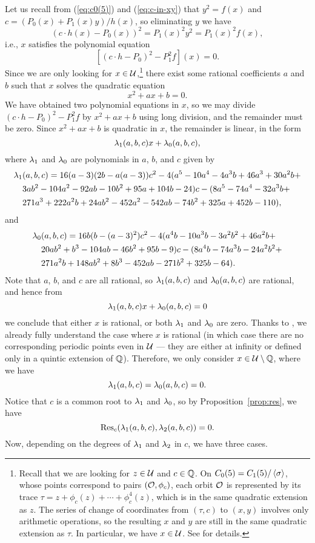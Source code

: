 Let us recall from (\ref{eq:c0(5)}) and (\ref{eq:c-in-xy}) that $y^2 =
f(x)$ and $c = (P_0(x) + P_1(x) y)/h(x)$, so eliminating $y$ we have
\[
(c \cdot h(x) - P_0(x))^2 = P_1(x)^2 y^2 = P_1(x)^2 f(x),
\]
i.e., $x$ satisfies the polynomial equation
\[
[(c \cdot h - P_0)^2 - P_1^2 f](x) = 0.
\]
Since we are only looking for $x \in \mathcal{U}$,\footnote{%
  Recall that we are looking for $z \in \mathcal{U}$ and $c \in \mathbb{Q}$. On $C_0(5)
  = C_1(5) / \left<\sigma\right>$, whose points correspond to pairs $(\mathcal{O},
  \phi_c)$, each orbit $\mathcal{O}$ is represented by its trace $\tau = z +
  \phi_c(z) + \cdots + \phi_c^4(z)$, which is in the same quadratic
  extension as $z$. The series of change of coordinates from $(\tau,
  c)$ to $(x, y)$ involves only arithmetic operations, so the
  resulting $x$ and $y$ are still in the same quadratic extension as
  $\tau$. In particular, we have $x \in \mathcal{U}$. See \cite{MR1480542} for
  details.}
there exist some rational coefficients $a$ and $b$ such that $x$
solves the quadratic equation
\[
x^2 + a x + b = 0.
\]
We have obtained two polynomial equations in $x$, so we may divide $(c
\cdot h - P_0)^2 - P_1^2 f$ by $x^2 + ax + b$ using long division, and
the remainder must be zero. Since $x^2 + ax + b$ is quadratic in $x$,
the remainder is linear, in the form
\[
\lambda_1(a, b, c) x + \lambda_0(a, b, c),
\]
where $\lambda_1$ and $\lambda_0$ are polynomials in $a$, $b$, and $c$ given by
\[
\begin{aligned}
  \lambda_1&(a, b, c) = 16 (a - 3) (2b - a(a-3)) c^2 -
  4(a^{5} - 10 a^{4} - 4 a^{3} b + 46 a^{3} + 30 a^{2} b + \\
  & 3 a b^{2} - 104 a^{2} - 92 a b - 10 b^{2} + 95 a + 104 b - 24) c -
  (8 a^{5} - 74 a^{4} - 32 a^{3} b + \\
  & 271 a^{3} + 222 a^{2} b + 24 a b^{2} - 452 a^{2} - 542 a b - 74
  b^{2} + 325 a + 452 b - 110),
\end{aligned}
\]
and
\[
\begin{aligned}
  \lambda_0&(a, b, c) = 16 b (b - (a-3)^2) c^2 -
  4(a^{4} b - 10 a^{3} b - 3 a^{2} b^{2} + 46 a^{2} b + \\
  & 20 a b^{2} + b^{3} - 104 a b - 46 b^{2} + 95 b - 9) c -
  (8 a^{4} b - 74 a^{3} b - 24 a^{2} b^{2} + \\
  & 271 a^{2} b + 148 a b^{2} + 8 b^{3} - 452 a b - 271 b^{2} + 325 b
  - 64).
\end{aligned}
\]
Note that $a$, $b$, and $c$ are all rational, so $\lambda_1(a, b, c)$ and
$\lambda_0(a, b, c)$ are rational, and hence from
\[
\lambda_1(a, b, c) x + \lambda_0(a, b, c) = 0
\]
we conclude that either $x$ is rational, or both $\lambda_1$ and $\lambda_0$ are
zero. Thanks to \cite{MR1480542}, we already fully understand the case
where $x$ is rational (in which case there are no corresponding
periodic points even in $\mathcal{U}$ --- they are either at infinity or
defined only in a quintic extension of $\mathbb{Q}$). Therefore, we only
consider $x \in \mathcal{U} \setminus \mathbb{Q}$, where we have
\[
\lambda_1(a, b, c) = \lambda_0(a, b, c) = 0.
\]
Notice that $c$ is a common root to $\lambda_1$ and $\lambda_0$, so by
Proposition~\ref{prop:res}, we have
\[
\mathrm{Res}_c(\lambda_1(a, b, c), \lambda_2(a, b, c)) = 0.
\]
Now, depending on the degrees of $\lambda_1$ and $\lambda_2$ in $c$, we have
three cases.

